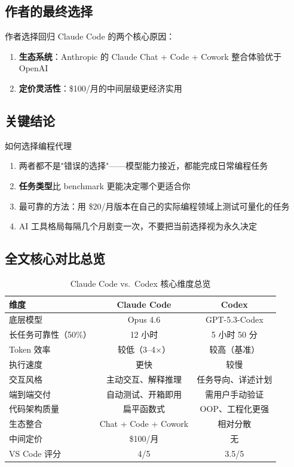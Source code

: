 \documentclass[a4paper]{article}
\begin{document}
\subsection{作者的最终选择}

作者选择回归 Claude Code 的两个核心原因：
\begin{enumerate}
    \item \textbf{生态系统}：Anthropic 的 Claude Chat + Code + Cowork 整合体验优于 OpenAI
    \item \textbf{定价灵活性}：\$100/月的中间层级更经济实用
\end{enumerate}

\subsection{关键结论}

\begin{importantbox}{如何选择编程代理}
\begin{enumerate}
    \item 两者都不是"错误的选择"——模型能力接近，都能完成日常编程任务
    \item \textbf{任务类型}比 benchmark 更能决定哪个更适合你
    \item 最可靠的方法：用 \$20/月版本在自己的实际编程领域上测试可量化的任务
    \item AI 工具格局每隔几个月剧变一次，不要把当前选择视为永久决定
\end{enumerate}
\end{importantbox}

\subsection{全文核心对比总览}

\begin{table}[H]
\centering
\caption{Claude Code vs.\ Codex 核心维度总览}
\begin{tabular}{lcc}
\toprule
\textbf{维度} & \textbf{Claude Code} & \textbf{Codex} \\
\midrule
底层模型 & Opus 4.6 & GPT-5.3-Codex \\
长任务可靠性（50\%） & 12 小时 & 5 小时 50 分 \\
Token 效率 & 较低（3--4$\times$） & 较高（基准） \\
执行速度 & 更快 & 较慢 \\
交互风格 & 主动交互、解释推理 & 任务导向、详述计划 \\
端到端交付 & 自动测试、开箱即用 & 需用户手动验证 \\
代码架构质量 & 扁平函数式 & OOP、工程化更强 \\
生态整合 & Chat + Code + Cowork & 相对分散 \\
中间定价 & \$100/月 & 无 \\
VS Code 评分 & 4/5 & 3.5/5 \\
\bottomrule
\end{tabular}
\end{table}
\end{document}

